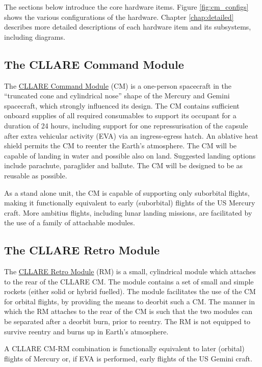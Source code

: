 \documentclass{report}
\begin{document}
The sections below introduce the core hardware items.  Figure \ref{fig:cm_configs} shows the various configurations of the hardware.  Chapter \ref{chap:detailed} describes more detailed descriptions of each hardware item and its subsystems, including diagrams.

\subsection{The CLLARE Command Module}

The \href{http://cstart.org/wiki/CLLARE_Command_Module}{CLLARE Command Module} (CM) is a one-person spacecraft in the ``truncated cone and cylindrical nose'' shape of the Mercury and Gemini spacecraft, which strongly influenced its design.  The CM contains sufficient onboard supplies of all required consumables to support its occupant for a duration of 24 hours, including support for one repressurisation of the capsule after extra vehicular activity (EVA) via an ingress-egress hatch.  An ablative heat shield permits the CM to reenter the Earth's atmosphere.  The CM will be capable of landing in water and possible also on land.  Suggested landing options include parachute, paraglider and ballute.  The CM will be designed to be as reusable as possible.

As a stand alone unit, the CM is capable of supporting only suborbital flights, making it functionally equivalent to early (suborbital) flights of the US Mercury craft.  More ambitius flights, including lunar landing missions, are facilitated by the use of a family of attachable modules.

\subsection{The CLLARE Retro Module}

The \href{http://cstart.org/wiki/CLLARE_Retro_Module}{CLLARE Retro Module} (RM) is a small, cylindrical module which attaches to the rear of the CLLARE CM.  The module contains a set of small and simple rockets (either solid or hybrid fuelled).  The module facilitates the use of the CM for orbital flights, by providing the means to deorbit such a CM.  The manner in which the RM attaches to the rear of the CM is such that the two modules can be separated after a deorbit burn, prior to reentry.  The RM is not equipped to survive reentry and burns up in Earth's atmosphere.

A CLLARE CM-RM combination is functionally equivalent to later (orbital) flights of Mercury or, if EVA is performed, early flights of the US Gemini craft.
\end{document}
